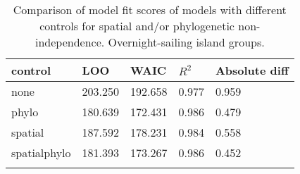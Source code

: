 \begin{longtable}{p{2cm}p{2cm}p{2cm}p{2cm}p{2cm}}
  \toprule
control & LOO & WAIC & $R^2$ & Absolute diff \\ 
  \midrule
none & 203.250 & 192.658 & 0.977 & 0.959 \\ 
  phylo & 180.639 & 172.431 & 0.986 & 0.479 \\ 
  spatial & 187.592 & 178.231 & 0.984 & 0.558 \\ 
  spatialphylo & 181.393 & 173.267 & 0.986 & 0.452 \\ 
   \bottomrule
\caption{Comparison of model fit scores of models with different controls for spatial and/or phylogenetic non-independence. Overnight-sailing island groups.} 
\label{model_fit_score_table_SBZR}
\end{longtable}
